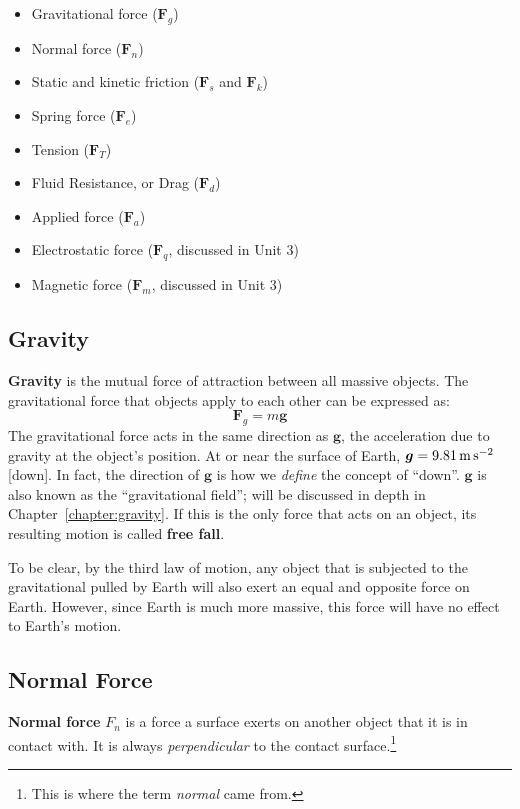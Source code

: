 \begin{itemize}[noitemsep]
\item Gravitational force ($\bm F_g$)
\item Normal force ($\bm F_n$)
\item Static and kinetic friction ($\bm F_s$ and  $\bm F_k$)
\item Spring force ($\bm F_e$)
\item Tension ($\bm F_T$)
\item Fluid Resistance, or Drag ($\bm F_d$)
\item Applied force ($\bm F_a$)
\item Electrostatic force ($\bm F_q$, discussed in Unit 3)
\item Magnetic force ($\bm F_m$, discussed in Unit 3)
\end{itemize}




\subsection{Gravity}
\textbf{Gravity} is the mutual force of attraction between all massive objects.
The gravitational force that objects apply to each other can be expressed as:
\begin{equation}
  \boxed{\bm F_g=m\bm g}
\end{equation}
The gravitational force acts in the same direction as $\bm g$, the acceleration
due to gravity at the object's position. At or near the surface of Earth,
$\bm g=\text{\SI{9.81}{\metre\per\second\squared}}$ [down]. In fact, the
direction of $\bm g$ is how we \emph{define} the concept of ``down''. $\bm g$
is also known as the ``gravitational field''; will be discussed in depth in
Chapter~\ref{chapter:gravity}. If this is the only force that acts on an object,
its resulting motion is called \textbf{free fall}.

To be clear, by the third law of motion, any object that is subjected to the
gravitational pulled by Earth will also exert an equal and opposite force on
Earth. However, since Earth is much more massive, this force will have no
effect to Earth's motion.

\subsection{Normal Force}
\textbf{Normal force} $F_n$ is a force a surface exerts on another object
that it is in contact with. It is always \emph{perpendicular} to the contact
surface.\footnote{This is where the term \emph{normal} came from.}

